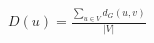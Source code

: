 \documentclass[12pt]{article}
\begin{document}
$D(u) = \frac{\sum_{u \in V}{d_G\left(u,v\right)}}{\left|V\right|} $
\end{document}
